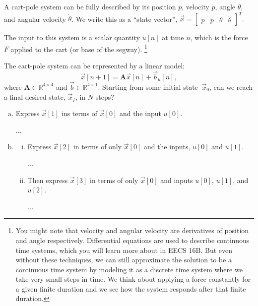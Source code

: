 \documentclass[11pt]{article}
\def\R{\mathbb{R}} %
\def\A{\textbf{A}} %
\begin{document}
\begin{enumerate}
\begin{enumerate}
	      	      A cart-pole system can be fully described by its position $p$, velocity $\dot p$, angle $\theta$, and angular velocity $\dot \theta$. We write this as a “state vector”, $\vec x = \begin{bmatrix}
	      	      p & \dot p & \theta & \dot \theta
	      	\end{bmatrix}^T.$
	      		      	
	      	The input to this system is a scalar quantity $u[n]$ at time $n$, which is the force $F$ applied to the cart (or base of the segway). \footnote{You might note that velocity and angular velocity are derivatives of position and angle respectively. Differential equations are used to describe continuous time systems, which you will learn more about in EECS 16B. But even without these techniques, we can still approximate the solution to be a continuous time system by modeling it as a discrete time system where we take very small steps in time. We think about applying a force constantly for a given finite duration and we see how the system responds after that finite duration.}
	      		      	
	      	The cart-pole system can be represented by a linear model:
	      	\begin{equation}
	      		\vec x[n+1] = \A\vec x[n] +\vec b_u[n],
	      	\end{equation}
	      	where $\A \in \R^{4\times4}$ and $\vec b \in \R^{4\times 1}$. Starting from some initial state $~\vec x_0$, can we reach a final desired state, $\vec x_f$, in $N$ steps?
	      	\begin{enumerate}[(a)]
	      		\item Express $\vec{x}[1]$ ins terms of $\vec{x}[0]$ and the input $u[0]$.
	      		      \begin{Answer}
	      		      	...
	      		      \end{Answer}
	      		      	      	    
	      		      \newpage
	      		      	      	    
	      		\item \begin{enumerate}[i.]
	      		\item Express $\vec x[2]$ in terms of only $\vec x[0]$ and the inputs, $u[0]$ and $u[1]$.
	      		      \begin{Answer}
	      		      	...
	      		      \end{Answer}
	      		      	      	        
	      		      \vspace{10px}
	      		\item Then express $\vec x[3]$ in terms of only $\vec x[0]$ and inputs $u[0]$, $u[1]$, and $u[2]$.
	      		      \begin{Answer}
	      		      	...
	      		      \end{Answer}
	      		      	      	        

\end{enumerate}
\end{enumerate}
\end{enumerate}
\end{enumerate}
\end{document}

